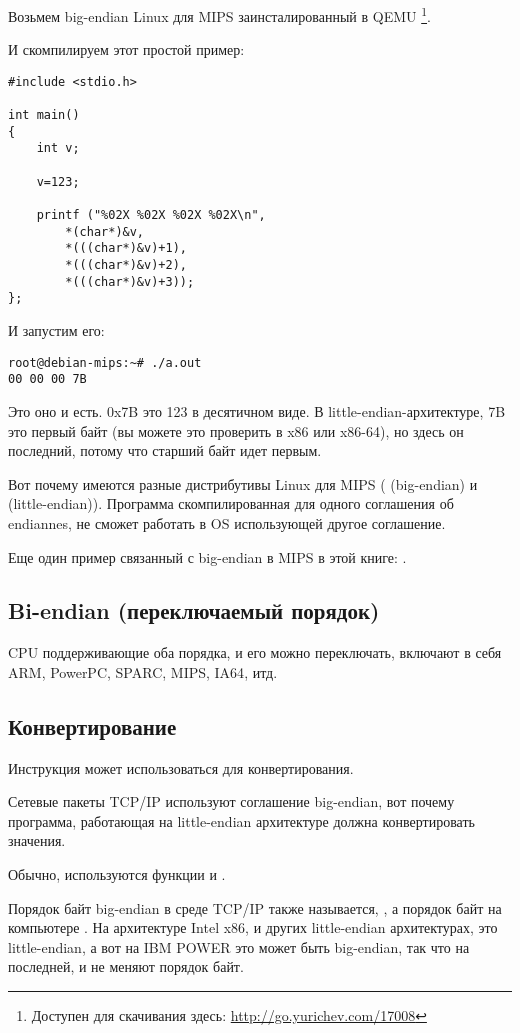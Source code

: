 Возьмем big-endian Linux для MIPS заинсталированный в QEMU
\footnote{Доступен для скачивания здесь: \url{http://go.yurichev.com/17008}}.

И скомпилируем этот простой пример:

\begin{lstlisting}[style=customc]
#include <stdio.h>

int main()
{
	int v;

	v=123;

	printf ("%02X %02X %02X %02X\n", 
		*(char*)&v,
		*(((char*)&v)+1),
		*(((char*)&v)+2),
		*(((char*)&v)+3));
};
\end{lstlisting}

И запустим его:

\begin{lstlisting}
root@debian-mips:~# ./a.out 
00 00 00 7B
\end{lstlisting}

Это оно и есть.
0x7B это 123 в десятичном виде.
В little-endian-архитектуре, 7B это первый байт (вы можете это проверить в x86 или x86-64),
но здесь он последний, потому что старший байт идет первым.

Вот почему имеются разные дистрибутивы Linux для MIPS
( (big-endian) и  (little-endian)).
Программа скомпилированная для одного соглашения об endiannes, не сможет работать в OS использующей
другое соглашение.

Еще один пример связанный с big-endian в MIPS в этой книге: .

\subsection{Bi-endian (переключаемый порядок)}

CPU поддерживающие оба порядка, и его можно переключать, включают в себя ARM, PowerPC, SPARC, MIPS, \ac{IA64}, итд.

\subsection{Конвертирование}

Инструкция  может использоваться для конвертирования.

Сетевые пакеты TCP/IP используют соглашение big-endian, вот почему программа, работающая на little-endian архитектуре
должна конвертировать значения.

Обычно, используются функции  и .

Порядок байт big-endian в среде TCP/IP также называется, ,
а порядок байт на компьютере .
На архитектуре Intel x86, и других little-endian архитектурах,  это little-endian, 
а вот на IBM POWER это может быть big-endian, так что на последней, 
 и  не меняют порядок байт.

